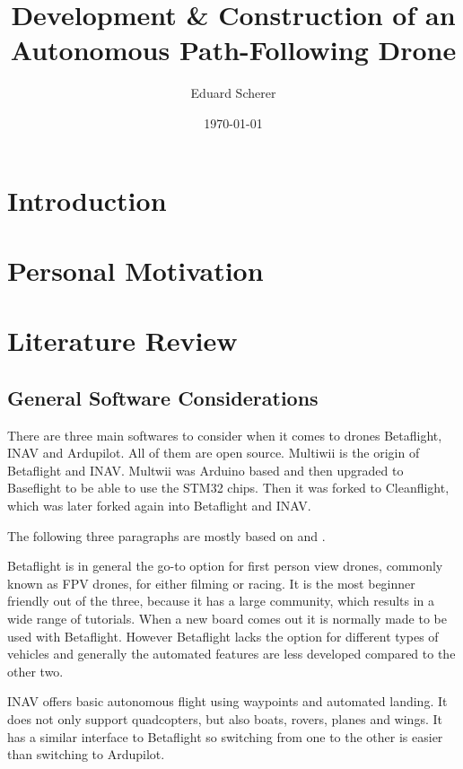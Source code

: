 \documentclass{article}
\author{Eduard Scherer}
\title{Development \& Construction of an Autonomous Path-Following Drone}
\date{\today}
\begin{document}
\maketitle
\tableofcontents
\pagebreak
	\section{Introduction}

	\section{Personal Motivation}
	\section{Literature Review}
	\subsection{General Software Considerations}
	
	There are three main softwares to consider when it comes to drones Betaflight, INAV and Ardupilot. All of them are open source. Multiwii is the origin of Betaflight and INAV. Multwii was Arduino based and then upgraded to Baseflight to be able to use the STM32 chips. Then it was forked to Cleanflight, which was later forked again into Betaflight and INAV\cite{history}. 
	
	The following three paragraphs are mostly based on \cite{firmwarearticle} and \cite{firmwarevideo}.
	
	Betaflight is in general the go-to option for first person view drones, commonly known as FPV drones, for either filming or racing. It is the most beginner friendly out of the three, because it has a large community, which results in a wide range of tutorials. When a new board comes out it is normally made to be used with Betaflight. However Betaflight lacks the option for different types of vehicles and generally the automated features are less developed compared to the other two. 
	
	INAV offers basic autonomous flight using waypoints and automated landing. It does not only support quadcopters, but also boats, rovers, planes and wings. It has a similar interface to Betaflight so switching from one to the other is easier than switching to Ardupilot.
	
\end{document}
